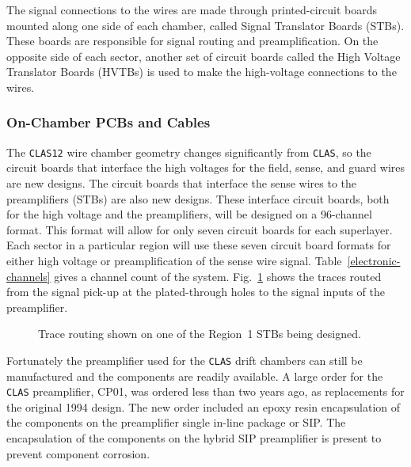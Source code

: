 The signal connections to the wires are made through printed-circuit 
boards mounted along one side of each chamber, called Signal Translator 
Boards (STBs).  These boards are responsible for signal routing and 
preamplification.  On the opposite side of each sector, another set of 
circuit boards called the High Voltage Translator Boards (HVTBs) is used 
to make the high-voltage connections to the wires.

\subsubsection{On-Chamber PCBs and Cables}

The {\tt CLAS12} wire chamber geometry changes significantly from {\tt CLAS}, 
so the circuit boards that interface the high voltages for the field, sense, 
and guard wires are new designs.  The circuit boards that interface the sense 
wires to the preamplifiers (STBs) are also new designs.   These interface 
circuit boards, both for the high voltage and the preamplifiers, will be 
designed on a 96-channel format.  This format will allow for only seven 
circuit boards for each superlayer.  Each sector in a particular region will 
use these seven circuit board formats for either high voltage or 
preamplification of the sense wire signal.  Table~\ref{electronic-channels} 
gives a channel count of the system.  Fig.~\ref{r1stb} shows the traces 
routed from the signal pick-up at the plated-through holes to the signal 
inputs of the preamplifier.

\begin{figure}[htbp]
\vspace{10.0cm}
\caption{\small{Trace routing shown on one of the Region~1 STBs being
designed.}}
\label{r1stb}
\end{figure}

Fortunately the preamplifier used for the {\tt CLAS} drift chambers can 
still be manufactured and the components are readily available.  A large 
order for the {\tt CLAS} preamplifier, CP01, was ordered less than two 
years ago, as replacements for the original 1994 design.  The new order 
included an epoxy resin encapsulation of the components on the preamplifier 
single in-line package or SIP.  The encapsulation of the components on the 
hybrid SIP preamplifier is present to prevent component corrosion.

